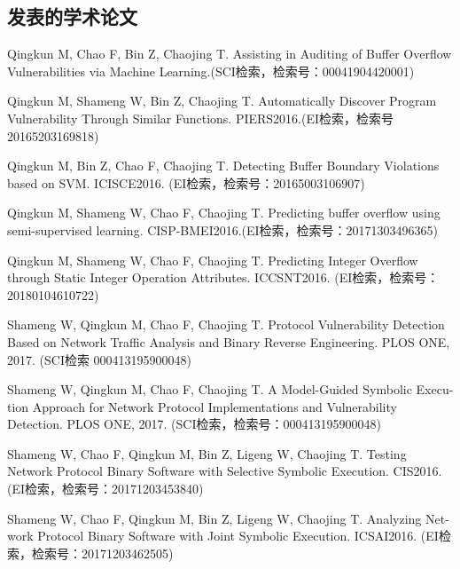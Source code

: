 \begin{resume}

  \section*{发表的学术论文} %

  \begin{enumerate}[{[}1{]}]
  \item Qingkun M, Chao F, Bin Z, Chaojing T. Assisting in Auditing of Buffer Overflow Vulnerabilities via Machine Learning.(SCI检索，检索号：00041904420001)
  
  \item Qingkun M, Shameng W, Bin Z, Chaojing T. Automatically Discover Program Vulnerability Through Similar Functions. PIERS2016.(EI检索，检索号20165203169818)
  
  \item Qingkun M, Bin Z, Chao F, Chaojing T. Detecting Buffer Boundary Violations based on SVM. ICISCE2016. (EI检索，检索号：20165003106907)
  
  \item Qingkun M, Shameng W, Chao F, Chaojing T. Predicting buffer overflow using semi-supervised learning. CISP-BMEI2016.(EI检索，检索号：20171303496365)
  
  \item Qingkun M, Shameng W, Chao F, Chaojing T. Predicting Integer Overflow through Static Integer Operation Attributes. ICCSNT2016. (EI检索，检索号：20180104610722)
  
  \item Shameng W, Qingkun M, Chao F, Chaojing T. Protocol Vulnerability Detection Based on Network Traffic Analysis and Binary Reverse Engineering. PLOS ONE, 2017. (SCI检索 000413195900048)
    
  \item Shameng W, Qingkun M, Chao F, Chaojing T. A Model-Guided Symbolic Execu-
  tion Approach for Network Protocol Implementations and Vulnerability Detection.
  PLOS ONE, 2017. (SCI检索，检索号：000413195900048)
  
  \item Shameng W, Chao F, Qingkun M, Bin Z, Ligeng W, Chaojing T. Testing Network
  Protocol Binary Software with Selective Symbolic Execution. CIS2016. (EI检索，检索号：20171203453840)
  
  \item Shameng W, Chao F, Qingkun M, Bin Z, Ligeng W, Chaojing T. Analyzing Net-
  work Protocol Binary Software with Joint Symbolic Execution. ICSAI2016. (EI检索，检索号：20171203462505)
  

\end{enumerate}
\end{resume}
